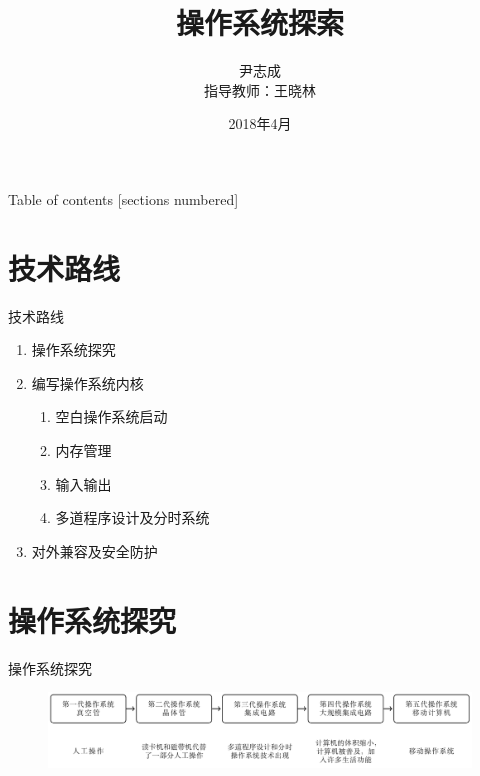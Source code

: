 \documentclass{beamer}
\title{操作系统探索}
\date{2018年4月}
\author{尹志成 \\ 指导教师：王晓林}
\institute{西南林业大学大数据与智能工程学院}
\begin{document}
    \maketitle
    \begin{frame}{Table of contents}
      [sections numbered]
      \tableofcontents[hideallsubsections]
    \end{frame}
    
    \section{技术路线}
    \begin{frame}[fragile]{技术路线}
        \begin{enumerate}
            \item 操作系统探究
            \item 编写操作系统内核
              \begin{enumerate}
                  \item 空白操作系统启动
                  \item 内存管理
                  \item 输入输出
                  \item 多道程序设计及分时系统
              \end{enumerate}
            \item 对外兼容及安全防护
        \end{enumerate}
    \end{frame}

    \section{操作系统探究}
    \begin{frame}{操作系统探究}
      \begin{figure}[H]
        \centering
        \includegraphics[width=\textwidth]{../Fig/explorer.pdf}
      \end{figure}
    \end{frame}
\end{document}
